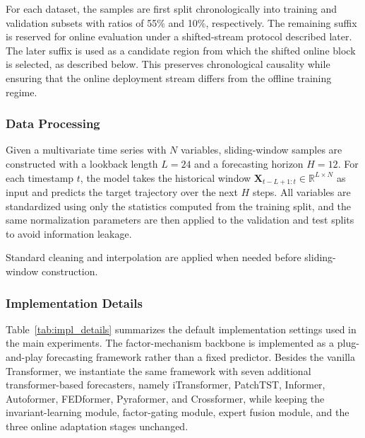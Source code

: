 ﻿\documentclass[journal]{IEEEtran}
\DeclareRobustCommand{\oldtext}[1]{{\color{revisionred}#1}}
\DeclareRobustCommand{\newtext}[1]{{\color{revisionblue}#1}}
\DeclareRobustCommand{\why}[1]{{\color{revisionblue}{\footnotesize (#1)}}}
\DeclareRobustCommand{\rw}[3]{\oldtext{#1} \newtext{#2}\why{#3}}
\begin{document}
For each dataset, the samples are first split chronologically into training and validation subsets with ratios of 55\% and 10\%, respectively. \rw{The remaining suffix is reserved for online evaluation under a shifted-stream protocol described later.}{The later suffix is used as a candidate region from which the shifted online block is selected, as described below.}{区分完整 35\% suffix 与选出的高 shift block。} This preserves chronological causality while ensuring that the online deployment stream differs from the offline training regime.

\subsubsection{Data Processing}
Given a multivariate time series with $N$ variables, sliding-window samples are constructed with a lookback length $L=24$ and a forecasting horizon $H=12$. For each timestamp $t$, the model takes the historical window $\mathbf{X}_{t-L+1:t}\in\mathbb{R}^{L\times N}$ as input and predicts the target trajectory over the next $H$ steps. All variables are standardized using only the statistics computed from the training split, and the same normalization parameters are then applied to the validation and test splits to avoid information leakage.

Standard cleaning and interpolation are applied when needed before sliding-window construction.

\subsubsection{Implementation Details}
Table~\ref{tab:impl_details} summarizes the default implementation settings used in the main experiments. The factor-mechanism backbone is implemented as a plug-and-play forecasting framework rather than a fixed predictor. Besides the vanilla Transformer, we instantiate the same framework with seven additional transformer-based forecasters, namely iTransformer, PatchTST, Informer, Autoformer, FEDformer, Pyraformer, and Crossformer, while keeping the invariant-learning module, factor-gating module, expert fusion module, and the three online adaptation stages unchanged.
\end{document}
